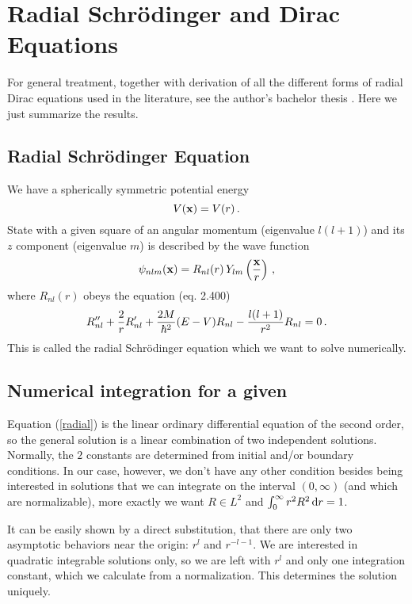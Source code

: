 \section{Radial Schrödinger and Dirac Equations}

For general treatment, together with derivation of all the different forms of
radial Dirac equations used in the literature, see the author's bachelor thesis
\cite{bachelor-thesis}. Here we just summarize the results.

\subsection{Radial Schrödinger Equation}

We have a spherically symmetric potential energy 
\begin{equation*}
  V({\bf x})=V(r)\,.
\end{equation*}
State with a given square of an angular momentum (eigenvalue $l(l+1)$) and its $z$ component (eigenvalue $m$) is described by the wave function 
\begin{equation}
  \psi_{nlm}({\bf x})=R_{nl}(r)\,Y_{lm}\left({\bf x}\over r\right)\,,  \label{psi}
\end{equation}
where $R_{nl}(r)$ obeys the equation \cite{formanek} (eq. 2.400) 
\begin{equation}
  R_{nl}''+{2\over r}R_{nl}'+{2M\over\hbar^2}(E-V)R_{nl}- {l(l+1)\over r^2}R_{nl}=0\,.  \label{radial}
\end{equation}
This is called the radial Schrödinger equation which we want to solve numerically.

\subsection{Numerical integration for a given }

Equation (\ref{radial}) is the linear ordinary differential equation of the second order, so the general solution is a linear combination of two independent solutions. Normally, the $2$ constants are determined from initial and/or boundary conditions. In our case, however, we don't have any other condition besides being interested in solutions that we can integrate on the interval $(0,\infty)$ (and which are normalizable), more exactly we want $R\in L^2$ and $\int_0^\infty r^2R^2\,{\rm d} r=1$.

It can be easily shown by a direct substitution, that there are only two asymptotic behaviors near the origin: $r^l$ and $r^{-l-1}$. We are interested in quadratic integrable solutions only, so we are left with $r^l$ and only one integration constant, which we calculate from a normalization. This determines the solution uniquely.

